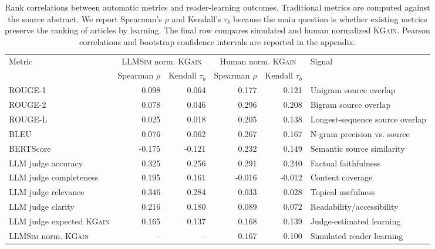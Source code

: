 \begin{table}[t]
\centering
\small
\setlength{\tabcolsep}{3.5pt}
\begin{tabular}{lrrrrl}
\toprule
Metric & \multicolumn{2}{c}{\textsc{LLMSim} norm. \textsc{KGain}} & \multicolumn{2}{c}{Human norm. \textsc{KGain}} & Signal \\
\cmidrule(lr){2-3}\cmidrule(lr){4-5}
 & Spearman $\rho$ & Kendall $\tau_b$ & Spearman $\rho$ & Kendall $\tau_b$ & \\
\midrule
ROUGE-1 & 0.098 & 0.064 & 0.177 & 0.121 & Unigram source overlap \\
ROUGE-2 & 0.078 & 0.046 & 0.296 & 0.208 & Bigram source overlap \\
ROUGE-L & 0.025 & 0.018 & 0.205 & 0.138 & Longest-sequence source overlap \\
BLEU & 0.076 & 0.062 & 0.267 & 0.167 & N-gram precision vs. source \\
BERTScore & -0.175 & -0.121 & 0.232 & 0.149 & Semantic source similarity \\
LLM judge accuracy & 0.325 & 0.256 & 0.291 & 0.240 & Factual faithfulness \\
LLM judge completeness & 0.195 & 0.161 & -0.016 & -0.012 & Content coverage \\
LLM judge relevance & 0.346 & 0.284 & 0.033 & 0.028 & Topical usefulness \\
LLM judge clarity & 0.216 & 0.180 & 0.089 & 0.072 & Readability/accessibility \\
LLM judge expected \textsc{KGain} & 0.165 & 0.137 & 0.168 & 0.139 & Judge-estimated learning \\
\textsc{LLMSim} norm. \textsc{KGain} & -- & -- & 0.167 & 0.100 & Simulated reader learning \\
\bottomrule
\end{tabular}
\caption{Rank correlations between automatic metrics and reader-learning outcomes. Traditional metrics are computed against the source abstract. We report Spearman's $\rho$ and Kendall's $\tau_b$ because the main question is whether existing metrics preserve the ranking of articles by learning. The final row compares simulated and human normalized \textsc{KGain}. Pearson correlations and bootstrap confidence intervals are reported in the appendix.}
\label{tab:metrics_vs_kgain}
\end{table}
